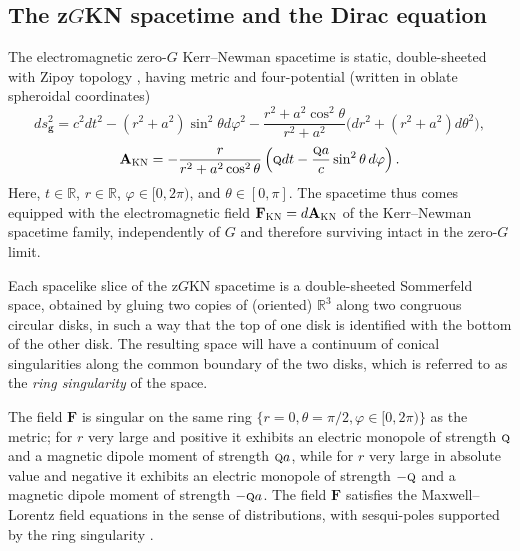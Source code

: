 \documentclass[11 pt]{article}
\newcommand\bbR{{\mathbb R}}
\renewcommand\({\left(}
\renewcommand\){\right)}
\newcommand\<{\langle}
\renewcommand\>{\rangle}
\newcommand\8{\infty}
\newcommand\beq{\begin{equation}}
\newcommand\eeq{\end{equation}}
\newcommand{\R}{\mathbb R}
\newcommand{\bF}{\mathbf{F}}
\newcommand{\bg}{\mathbf{g}}
\newcommand{\bAKN}{\mathbf{A}_{\textsc{KN}}}
\begin{document}
 \subsection{The z$G$KN spacetime and the Dirac equation}\label{zGKND}
 The electromagnetic zero-$G$ Kerr--Newman spacetime is static, double-sheeted with Zipoy topology \cite{Zipoy}, having
metric and four-potential (written in oblate spheroidal coordinates)
\beq
ds^2_{\bg} = c^2dt^2 - (r^2 + a^2)\sin^2\theta d\varphi^2 - \frac{r^2 + a^2\cos^2\theta}{r^2 + a^2}\big(dr^2 + (r^2 + a^2)d\theta^2\big) ,
\eeq
\beq\label{def:AKN}
\bAKN = - \frac{r}{r^2+a^2\cos^2\theta} \left(\textsc{q}dt - \frac{\textsc{q}a}{c} \sin^2\theta\, d\varphi\right).
\eeq
 Here, $t\in \bbR$, $r\in\bbR$, $\varphi\in[0,2\pi)$, and $\theta\in [0,\pi]$.
 The spacetime thus comes equipped with the electromagnetic field $\bF_{\textsc{KN}} =d\bAKN$ of the Kerr--Newman spacetime family, independently 
 of $G$ and therefore surviving intact in the zero-$G$ limit.
  
 Each spacelike slice of the z$G$KN spacetime is a double-sheeted Sommerfeld  space,
obtained by gluing two copies of (oriented) $\R^3$ along two congruous  circular disks, in such a way that the top of one disk is identified 
with the bottom of the other disk. 
 The resulting space will have a continuum of conical singularities along the common boundary of the two disks, which is referred to as the 
 {\em ring singularity} of the space.
 
 The field $\bF$ is singular on the same ring $\{r=0, \theta=\pi/2,\varphi\in[0,2\pi)\}$ as the metric; for $r$ very large and positive it exhibits an 
electric monopole of strength $\textsc{q}$ and a magnetic dipole moment of strength $\textsc{q}a$, while
for $r$ very large in absolute value and negative it exhibits an electric monopole of strength $-\textsc{q}$ and a magnetic dipole moment of strength 
$-\textsc{q}a$.
 The field $\bF$ satisfies the Maxwell--Lorentz field equations in the sense of distributions, with sesqui-poles supported by the ring singularity \cite{TZzGKN}.

 
\end{document}
